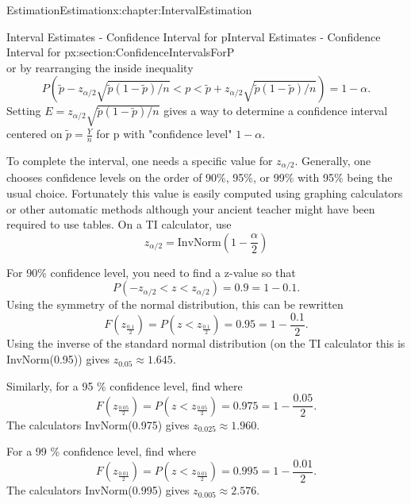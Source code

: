 \documentclass[oneside,10pt,]{book}
\numberwithin{equation}{section}
\newcommand{\lt}{<}
\begin{document}
\begin{chapterptx}{Estimation}{}{Estimation}{}{}{x:chapter:IntervalEstimation}
\begin{sectionptx}{Interval Estimates - Confidence Interval for p}{}{Interval Estimates - Confidence Interval for p}{}{}{x:section:ConfidenceIntervalsForP}
\begin{equation*}
\end{equation*}
or by rearranging the inside inequality%
\begin{equation*}
P( \tilde{p} - z_{ \alpha/2}\sqrt{\tilde{p}(1-\tilde{p})/n} \lt  p \lt \tilde{p} + z_{ \alpha/2}\sqrt{\tilde{p}(1-\tilde{p})/n}) = 1 - \alpha.
\end{equation*}
Setting \(E = z_{ \alpha/2}\sqrt{\tilde{p}(1-\tilde{p})/n}\) gives a way to determine a confidence interval centered on \(\tilde{p} = \frac{Y}{n}\) for p with "confidence level" \(1-\alpha\).%
\par
To complete the interval, one needs a specific value for \(z_{ \alpha/2}\). Generally, one chooses confidence levels on the order of 90\%, 95\%, or 99\% with 95\% being the usual choice.  Fortunately this value is easily computed using graphing calculators or other automatic methods although your ancient teacher might have been required to use tables. On a TI calculator, use%
\begin{equation*}
z_{\alpha /2} = \text{InvNorm}( 1 - \frac{\alpha}{2} )
\end{equation*}
%
\par
For 90\% confidence level, you need to find a z-value so that%
\begin{equation*}
P( -z_{ \alpha/2} \lt z \lt z_{ \alpha/2}) = 0.9 = 1 - 0.1 .
\end{equation*}
Using the symmetry of the normal distribution, this can be rewritten%
\begin{equation*}
F(z_{ \frac{0.1}{2}}) = P( z \lt z_{ \frac{0.1}{2}}) = 0.95 = 1 - \frac{0.1}{2} .
\end{equation*}
Using the inverse of the standard normal distribution (on the TI calculator this is InvNorm(0.95)) gives \(z_{ 0.05} \approx 1.645\).%
\par
Similarly, for a 95 \% confidence level, find where%
\begin{equation*}
F(z_{ \frac{0.05}{2}}) = P( z \lt z_{ \frac{0.05}{2}}) = 0.975 = 1 - \frac{0.05}{2} .
\end{equation*}
The calculators InvNorm(0.975) gives \(z_{ 0.025} \approx 1.960\).%
\par
For a 99 \% confidence level, find where%
\begin{equation*}
F(z_{ \frac{0.01}{2}}) = P( z \lt z_{ \frac{0.01}{2}}) = 0.995 = 1 - \frac{0.01}{2} .
\end{equation*}
The calculators InvNorm(0.995) gives \(z_{ 0.005} \approx 2.576\).%
\par

\end{sectionptx}
\end{chapterptx}
\end{document}
